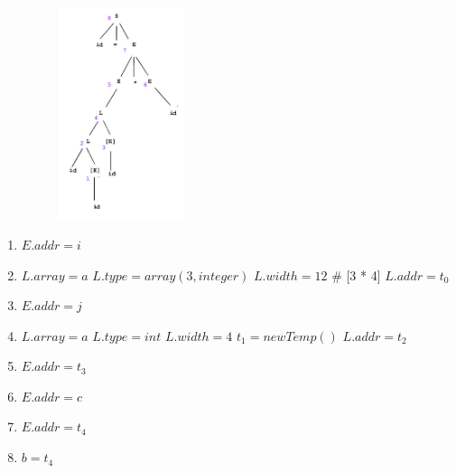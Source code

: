 \documentclass[11pt]{article}
\begin{document}
\begin{center}
  \begin{minipage}[t]{\linewidth}
    \begin{multicols}{3}
      \begin{figure}[H]
        \includegraphics[height=6.2cm, width=5cm]{./img/05DerivationTree.png}
      \end{figure}
      \begin{enumerate}
        \item $E.addr = i$
        \item $L.array = a$ 
        \newline $L.type = array(3, integer)$
        \newline $L.width = 12$ {\color{teal} \quad \# [3 * 4]}
        \newline $L.addr = t_0$
        \item $E.addr = j$
        \item $L.array = a$
        \newline $L.type = int$
        \newline $L.width = 4$
        \newline $t_1 = newTemp()$
        \newline $L.addr = t_2$
        \item $E.addr = t_3$
        \item $E.addr = c$
        \item $E.addr = t_4$
        \item {\color{red} $b = t_4$}
      \end{enumerate}
    \end{multicols}
  \end{minipage}
\end{center}
\end{document}
